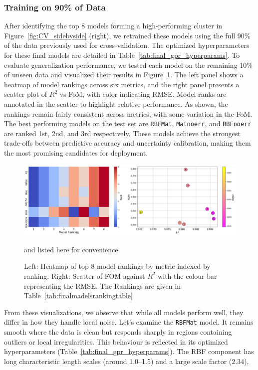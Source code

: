 \documentclass[12pt]{article}
\begin{document}
\subsubsection*{Training on 90\% of Data}
After identifying the top 8 models forming a high-performing cluster in Figure~\ref{fig:CV_sidebyside} (right),
 we retrained these models using the full 90\% of the data previously used for cross-validation. The optimized hyperparameters for these final models are detailed in Table~\ref{tab:final_gpr_hyperparams}. 
To evaluate generalization performance, we tested each model on the remaining 10\% of unseen data and visualized their results in Figure~\ref{fig:comparing_metrics}.
 The left panel shows a heatmap of model rankings across six metrics, and the right panel presents a scatter plot of $R^2$ vs FoM, with color indicating RMSE. 
 Model ranks are annotated in the scatter to highlight relative performance.
As shown, the rankings remain fairly consistent across metrics, with some variation in the FoM. The best performing models on the test set are \texttt{RBFMat}, \texttt{Matnoerr}, and \texttt{RBFnoerr} are ranked 1st, 2nd, and 3rd respectively.
These models achieve the strongest trade-offs between predictive accuracy and uncertainty calibration, making them the most promising candidates for deployment.
\begin{figure}[H]
    \centering
    \includegraphics[width=\textwidth]{LatexPlots/final_gps_plots/metric_of_finalists_comparison.png}
    \caption{Left: Heatmap of top 8 model rankings by metric indexed by ranking.
    Right: Scatter of FOM against \(R^2\) with the colour bar representing the RMSE.
    The Rankings are given in Table~\ref{tab:finalmadelsrankingtable}} and listed here for convenience
    \label{fig:comparing_metrics}
\end{figure}
From these visualizations, we observe that while all models perform well, they differ in how they handle local noise.
Let's examine the \texttt{RBFMat} model. It remains smooth where the data is clean but responds sharply in regions containing outliers or local irregularities.
This behaviour is reflected in its optimized hyperparameters (Table~\ref{tab:final_gpr_hyperparams}). The RBF component has long characteristic length scales (around 1.0--1.5) and a large scale factor ($2.34$),
\end{document}
